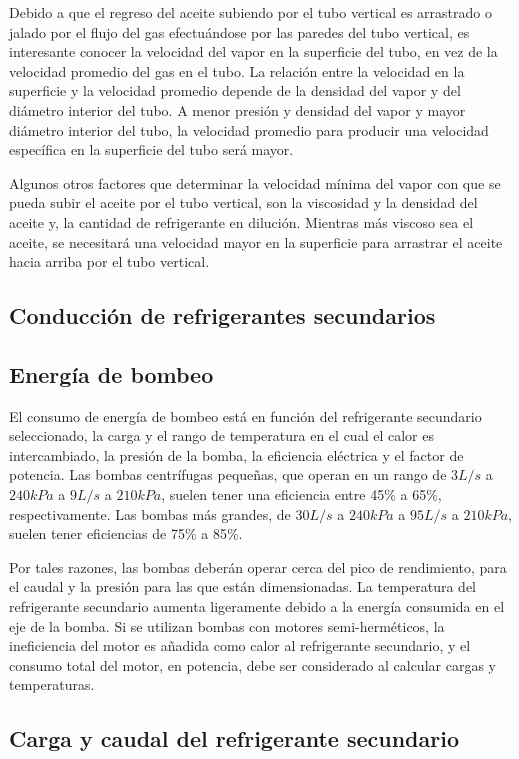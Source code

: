 	Debido a que el regreso del aceite subiendo por el tubo vertical es arrastrado o jalado por el flujo del gas efectuándose por las paredes del tubo vertical, es interesante conocer la velocidad del vapor en la superficie del tubo, en vez de la velocidad promedio del gas en el tubo. La relación entre la velocidad en la superficie y la velocidad promedio depende de la densidad del vapor y del diámetro interior del tubo. A menor presión y densidad del vapor y mayor diámetro interior del tubo, la velocidad promedio para producir una velocidad específica en la superficie del tubo será mayor.

	Algunos otros factores que determinar la velocidad mínima del vapor con que se pueda subir el aceite por el tubo vertical, son la viscosidad y la densidad del aceite y, la cantidad de refrigerante en dilución. Mientras más viscoso sea el aceite, se necesitará una velocidad mayor en la superficie para arrastrar el aceite hacia arriba por el tubo vertical.

	\subsection{Conducción de refrigerantes secundarios}

	\subsection{Energía de bombeo}

	El consumo de energía de bombeo está en función del refrigerante secundario seleccionado, la carga y el rango de temperatura en el cual el calor es intercambiado, la presión de la bomba, la eficiencia eléctrica y el factor de potencia. Las bombas centrífugas pequeñas, que operan en un rango de $3L/s$ a $240kPa$ a $9L/s$ a $210kPa$, suelen tener una eficiencia entre 45\% a 65\%, respectivamente. Las bombas más grandes, de $30L/s$ a $240kPa$ a $95L/s$ a $210kPa$, suelen tener eficiencias de 75\% a 85\%.

	Por tales razones, las bombas deberán operar cerca del pico de rendimiento, para el caudal y la presión para las que están dimensionadas. La temperatura del refrigerante secundario aumenta ligeramente debido a la energía consumida en el eje de la bomba. Si se utilizan bombas con motores semi-herméticos, la ineficiencia del motor es añadida como calor al refrigerante secundario, y el consumo total del motor, en potencia, debe ser considerado al calcular cargas y temperaturas.

	
	\subsection{Carga y caudal del refrigerante secundario}
	

